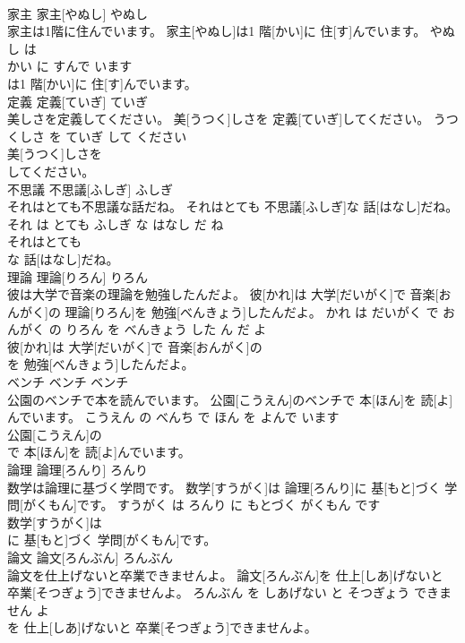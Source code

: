 \documentclass[8pt]{extreport}
\begin{document}
\begin{CJK}{UTF8}{min}
\\	家主	家主[やぬし]	やぬし	
\\	家主は1階に住んでいます。	家主[やぬし]は1 階[かい]に 住[す]んでいます。	やぬし は 
\\	かい に すんで います	
\\	は1 階[かい]に 住[す]んでいます。			
\\	定義	定義[ていぎ]	ていぎ	
\\	美しさを定義してください。	美[うつく]しさを 定義[ていぎ]してください。	うつくしさ を ていぎ して ください	
\\	美[うつく]しさを
\\	してください。			
\\	不思議	不思議[ふしぎ]	ふしぎ	
\\	それはとても不思議な話だね。	それはとても 不思議[ふしぎ]な 話[はなし]だね。	それ は とても ふしぎ な はなし だ ね	
\\	それはとても
\\	な 話[はなし]だね。			
\\	理論	理論[りろん]	りろん	
\\	彼は大学で音楽の理論を勉強したんだよ。	彼[かれ]は 大学[だいがく]で 音楽[おんがく]の 理論[りろん]を 勉強[べんきょう]したんだよ。	かれ は だいがく で おんがく の りろん を べんきょう した ん だ よ	
\\	彼[かれ]は 大学[だいがく]で 音楽[おんがく]の
\\	を 勉強[べんきょう]したんだよ。			
\\	ベンチ	ベンチ	ベンチ	
\\	公園のベンチで本を読んでいます。	公園[こうえん]のベンチで 本[ほん]を 読[よ]んでいます。	こうえん の べんち で ほん を よんで います	
\\	公園[こうえん]の
\\	で 本[ほん]を 読[よ]んでいます。			
\\	論理	論理[ろんり]	ろんり	
\\	数学は論理に基づく学問です。	数学[すうがく]は 論理[ろんり]に 基[もと]づく 学問[がくもん]です。	すうがく は ろんり に もとづく がくもん です	
\\	数学[すうがく]は
\\	に 基[もと]づく 学問[がくもん]です。			
\\	論文	論文[ろんぶん]	ろんぶん	
\\	論文を仕上げないと卒業できませんよ。	論文[ろんぶん]を 仕上[しあ]げないと 卒業[そつぎょう]できませんよ。	ろんぶん を しあげない と そつぎょう できません よ	
\\	を 仕上[しあ]げないと 卒業[そつぎょう]できませんよ。			

\end{CJK}
\end{document}

